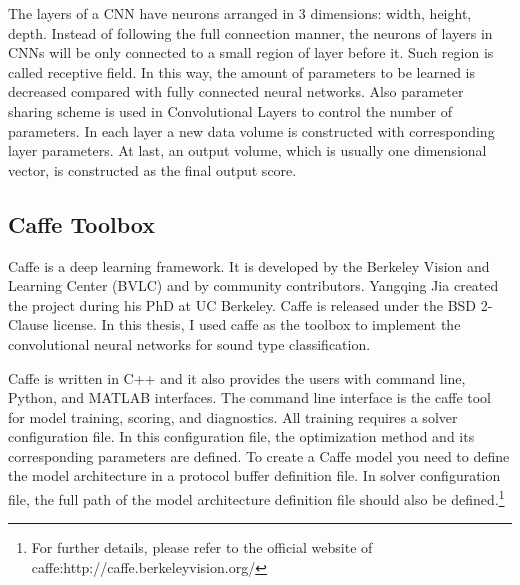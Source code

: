 The layers of a CNN have neurons arranged in 3 dimensions: width, height, depth. Instead of following the full connection manner, the neurons of layers in CNNs will be only connected to a small region of layer before it. Such region is called receptive field. In this way, the amount of parameters to be learned is decreased compared with fully connected neural networks. Also parameter sharing scheme is used in Convolutional Layers to control the number of parameters\cite{lecun1995convolutional}. In each layer a new data volume is constructed with corresponding layer parameters. At last, an output volume, which is usually one dimensional vector, is constructed as the final output score.

\subsection{Caffe Toolbox}
Caffe\cite{jia2014caffe} is a deep learning framework. It is developed by the Berkeley Vision and Learning Center (BVLC) and by community contributors. Yangqing Jia created the project during his PhD at UC Berkeley. Caffe is released under the BSD 2-Clause license. In this thesis, I used caffe as the toolbox to implement the convolutional neural networks for sound type classification.

Caffe is written in C++ and it also provides the users with command line, Python, and MATLAB interfaces. The command line interface is the caffe tool for model training, scoring, and diagnostics. All training requires a solver configuration file. In this configuration file, the optimization method and its corresponding parameters are defined. To create a Caffe model you need to define the model architecture in a protocol buffer definition file. In solver configuration file, the full path of the model architecture definition file should also be defined.\footnote{For further details, please refer to the official website of caffe:http://caffe.berkeleyvision.org/}

